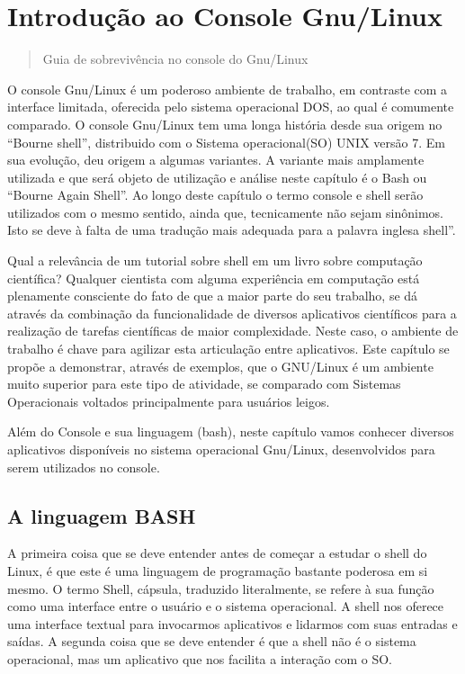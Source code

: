 \documentclass[a4paper,10pt,portuguese]{sphinxmanual}
\begin{document}
\chapter{Introdução ao Console Gnu/Linux}
\label{bash::doc}\label{bash:introducao-ao-console-gnu-linux}\begin{quote}

Guia de sobrevivência no console do Gnu/Linux
\end{quote}

O console Gnu/Linux é um poderoso ambiente de trabalho, em
contraste com a interface limitada, oferecida pelo sistema
operacional DOS, ao qual é comumente comparado. O console Gnu/Linux
tem uma longa história desde sua origem no ``Bourne shell'',
distribuido com o Sistema operacional(SO) UNIX versão 7. Em sua
evolução, deu origem a algumas variantes. A variante mais
amplamente utilizada e que será objeto de utilização e análise
neste capítulo é o Bash ou ``Bourne Again Shell''. Ao longo deste
capítulo o termo console e shell serão utilizados com o mesmo
sentido, ainda que, tecnicamente não sejam sinônimos. Isto se deve
à falta de uma tradução mais adequada para a palavra inglesa
shell''.

Qual a relevância de um tutorial sobre shell em um livro sobre
computação científica? Qualquer cientista com alguma experiência em
computação está plenamente consciente do fato de que a maior parte
do seu trabalho, se dá através da combinação da funcionalidade de
diversos aplicativos científicos para a realização de tarefas
científicas de maior complexidade. Neste caso, o ambiente de
trabalho é chave para agilizar esta articulação entre aplicativos.
Este capítulo se propõe a demonstrar, através de exemplos, que o
GNU/Linux é um ambiente muito superior para este tipo de atividade,
se comparado com Sistemas Operacionais voltados principalmente para
usuários leigos.

Além do Console e sua linguagem (bash), neste capítulo vamos
conhecer diversos aplicativos disponíveis no sistema operacional
Gnu/Linux, desenvolvidos para serem utilizados no console.


\section{A linguagem BASH}
\label{bash:a-linguagem-bash}
A primeira coisa que se deve entender antes de começar a estudar o
shell do Linux, é que este é uma linguagem de programação bastante
poderosa em si mesmo. O termo Shell, cápsula, traduzido
literalmente, se refere à sua função como uma interface entre o
usuário e o sistema operacional. A shell nos oferece uma interface
textual para invocarmos aplicativos e lidarmos com suas entradas e
saídas. A segunda coisa que se deve entender é que a shell não é o
sistema operacional, mas um aplicativo que nos facilita a interação
com o SO.
\end{document}
